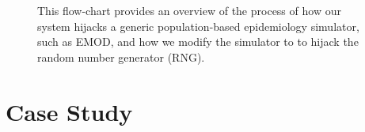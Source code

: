 \documentclass{article}
\newcommand{\bg}[1]{~{{[{\it \textcolor{red}{{\bf BG:} #1}}]}}}
\begin{document}
\begin{figure}
{
  }
  \label{fig:how}
  \caption{This flow-chart provides an overview of the process of how our system hijacks a generic population-based epidemiology simulator, such as EMOD, and how we modify the simulator to 
  to hijack the random number generator (RNG).}
  \end{figure}



\section{Case Study}
\label{sec:casestudy}
\end{document}
